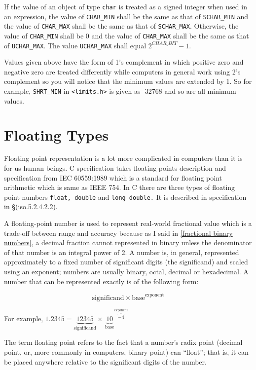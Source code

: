 If the value of an object of type \texttt{char} is treated as a signed integer
when used in an expression, the value of \texttt{CHAR\_MIN} shall be the same
as that of \texttt{SCHAR\_MIN} and the value of \texttt{CHAR\_MAX} shall be the
same as that of \texttt{SCHAR\_MAX}. Otherwise, the value of \texttt{CHAR\_MIN}
shall be 0 and the value of \texttt{CHAR\_MAX} shall be the same as that of 
\texttt{UCHAR\_MAX}. The value \texttt{UCHAR\_MAX} shall equal $2^{CHAR\_BIT} -
1$.

Values given above have the form of 1's complement in which positive zero and
negative zero are treated differently while computers in general work using 2's
complement so you will notice that the minimum values are extended by 1. So for
example, \texttt{SHRT\_MIN} in \texttt{<limits.h>} is given as -32768 and so
are all minimum values.

\section{Floating Types}
Floating point representation is a lot more complicated in computers than it
is for us human beings. C specification takes floating points description and
specification from IEC 60559:1989 which is a standard for floating point
arithmetic which is same as IEEE 754. In C there are three types of floating
point numbers \texttt{float, double} and \texttt{long double.} It is described
in specification in \S(iso.5.2.4.2.2).

A floating-point number is used to represent real-world fractional value which
is a trade-off between range and accuracy because as I said in \ref{fractional
  binary numbers}, a decimal fraction cannot represented in binary unless the
denominator of that number is an integral power of 2. A number is, in general,
represented approximately to a fixed number of significant digits (the
significand) and scaled using an exponent; numbers are usually binary, octal,
decimal or hexadecimal. A number that can be represented exactly is of the
following form:

$$\text{significand} \times \text{base}^\text{exponent}$$

For example, $1.2345 = \underbrace{12345}_\text{significand} \times
\,\underbrace{10}_\text{base}\!\!\!\!\!\!^{\overbrace{-4}^\text{exponent}}$

The term floating point refers to the fact that a number's radix point (decimal
point, or, more commonly in computers, binary point) can ``float''; that is, it
can be placed anywhere relative to the significant digits of the number.

